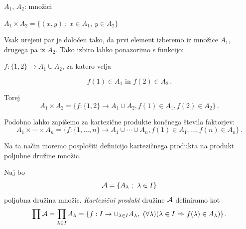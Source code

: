 \documentclass[11pt,paper=b5,footinclude,headinclude]{scrbook} %
\def\sledi {{~\Rightarrow~}}
\def\zgled{\noindent\textbf{\color{blue} Zgled: }}
\begin{document}
%
%
%
%
%

$A_1$, $A_2$: množici

$A_1\times A_2 = \{(x,y)~;~x\in A_1,~y\in A_2\}$

Vsak urejeni par je določen tako, da prvi element izberemo iz množice $A_1$, drugega pa iz $A_2$. Tako izbiro lahko ponazorimo s funkcijo:

$f:\{1,2\} \to A_1\cup A_2$, za katero velja

$$f(1)\in A_1 \textrm{ in }f(2)\in A_2\,.$$

Torej
$$A_1\times A_2 = \{f:\{1,2\} \to A_1\cup A_2,
f(1)\in A_1, f(2)\in A_2\}\,.$$

Podobno lahko zapišemo za kartezične produkte končnega števila faktorjev:
$$A_1\times \cdots \times A_n= \{f:\{1,\ldots, n\} \to A_1\cup \cdots\cup A_n,
f(1)\in A_1, \ldots, f(n)\in A_n\}\,.$$

\bigskip
Na ta način moremo posplošiti definicijo kartezičnega produkta na produkt poljubne družine množic.

Naj bo
$${\cal A}=\{A_{\lambda}~;~\lambda\in I\}$$
poljubna družina množic. {\em Kartezični produkt} družine ${\cal A}$ definiramo kot $$\prod{\cal A} = \prod_{\lambda\in I}A_\lambda = \{f:I\to\cup_{\lambda\in I}A_\lambda,~(\forall\lambda)(\lambda\in I\sledi f(\lambda)\in A_\lambda)\}\,.$$
\end{document}
